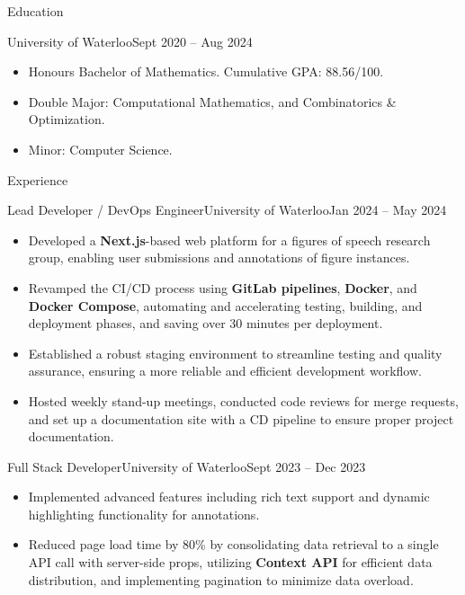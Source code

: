 \documentclass[]{mcdowellcv}
\begin{document}
	\makeheader
	\begin{cvsection}{Education}
		\begin{cvsubsection}{University of Waterloo}{}{Sept 2020 -- Aug 2024}
			\begin{itemize}
				\item Honours Bachelor of Mathematics. Cumulative GPA: 88.56/100.
				\item Double Major: Computational Mathematics, and Combinatorics \& Optimization.
				\item Minor: Computer Science.
			\end{itemize}
		\end{cvsubsection}
	\end{cvsection}
	\begin{cvsection}{Experience}
		\begin{cvsubsection}{Lead Developer / DevOps Engineer}{University of Waterloo}{Jan 2024 -- May 2024}	
			\begin{itemize}
				\item Developed a \textbf{Next.js}-based web platform for a figures of speech research group, enabling user submissions and annotations of figure instances.
				\item Revamped the CI/CD process using \textbf{GitLab pipelines}, \textbf{Docker}, and \textbf{Docker Compose}, automating and accelerating testing, building, and deployment phases, and saving over 30 minutes per deployment.
				\item Established a robust staging environment to streamline testing and quality assurance, ensuring a more reliable and efficient development workflow.
				\item Hosted weekly stand-up meetings, conducted code reviews for merge requests, and set up a documentation site with a CD pipeline to ensure proper project documentation.
			\end{itemize}	
		\end{cvsubsection}
		\begin{cvsubsection}{Full Stack Developer}{University of Waterloo}{Sept 2023 -- Dec 2023}
			\begin{itemize}
				\item Implemented advanced features including rich text support and dynamic highlighting functionality for annotations.
				\item Reduced page load time by 80\% by consolidating data retrieval to a single API call with server-side props, utilizing \textbf{Context API} for efficient data distribution, and implementing pagination to minimize data overload.

\end{itemize}
\end{cvsubsection}
\end{cvsection}
\end{document}
